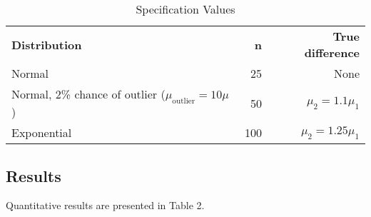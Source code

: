 \documentclass{report}
\begin{document}
\begin{table}[h]
	\caption{Specification Values}
	\vspace{1em}
	\centering
	\begin{tabular}{|l r r|}
		\hline
		\textbf{Distribution} & \textbf{n} & \textbf{True difference}\\
		Normal & 25 & None \\
		Normal, 2\% chance of outlier ($\mu_{\mathrm{outlier}}=10\mu$) & 50 & $\mu_2 = 1.1 \mu_1$ \\
		Exponential & 100 & $\mu_2 = 1.25 \mu_1$\\ 
		\hline
	\end{tabular}
\end{table}

\subsection*{Results}

Quantitative results are presented in Table 2.
\end{document}
